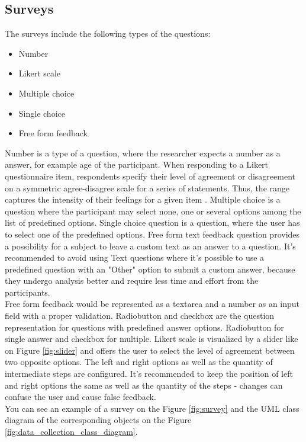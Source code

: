 \subsection{Surveys}\label{subsec:surveys}

The surveys include the following types of the questions:
\begin{itemize}
\item Number
\item Likert scale
\item Multiple choice
\item Single choice
\item Free form feedback
\end{itemize}

Number is a type of a question, where the researcher expects a number as a answer, for example age of the participant. When responding to a Likert questionnaire item, respondents specify their level of agreement or disagreement on a symmetric agree-disagree scale for a series of statements. Thus, the range captures the intensity of their feelings for a given item \cite{wiki:Likert_scale}. Multiple choice is a question where the participant may select none, one or several options among the list of predefined options. Single choice question is a question, where the user has to select one of the predefined options. Free form text feedback question provides a possibility for a subject to leave a custom text as an answer to a question. It's recommended to avoid using Text questions where it's possible to use a predefined question with an "Other" option to submit a custom answer, because they undergo analysis better and require less time and effort from the participants.\\

Free form feedback would be represented as a textarea and a number as an input field with a proper validation. Radiobutton and checkbox are the question representation for questions with predefined answer options. Radiobutton for single answer and checkbox for multiple.  Likert scale is visualized by a slider like on Figure \ref{fig:slider} and offers the user to select the level of agreement between two opposite options. The left and right options as well as the quantity of intermediate steps are configured. It's recommended to keep the position of left and right options the same as well as the quantity of the steps - changes can confuse the user and cause false feedback. \\

You can see an example of a survey on the Figure \ref{fig:survey} and the UML class diagram of the corresponding objects on the Figure \ref{fig:data_collection_class_diagram}.\\
 
